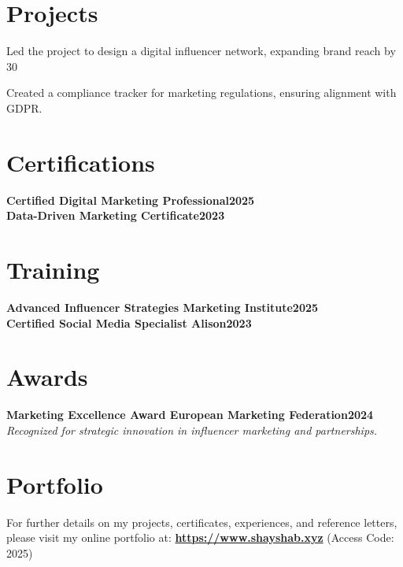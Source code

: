 \documentclass[letterpaper,10pt]{article}
\newcommand{\heading}[2]{
  \hspace{10pt}#1\hfill#2\\
}
\newcommand{\headingBf}[2]{
  \heading{\textbf{#1}}{\textbf{#2}}
}
\newcommand{\headingIt}[2]{
  \heading{\textit{#1}}{\textit{#2}}
}
\newenvironment{resume_list}{
  \vspace{-7pt}
  \begin{itemize}[itemsep=-2px, parsep=1pt, leftmargin=20pt, labelsep=10pt]
}{
  \end{itemize}
}
\begin{document}
\vspace{-1em}

\section{Projects}

\begin{resume_list}
    \item Led the project to design a digital influencer network, expanding brand reach by 30%
    \item Created a compliance tracker for marketing regulations, ensuring alignment with GDPR.
\end{resume_list}

\vspace{-1em}

\section{Certifications}

\headingBf{Certified Digital Marketing Professional}{2025}
\headingBf{Data-Driven Marketing Certificate}{2023}

\vspace{-0.5em}

\section{Training}
\headingBf{Advanced Influencer Strategies \textnormal{Marketing Institute}}{2025}
\headingBf{Certified Social Media Specialist \textnormal{Alison}}{2023}

\vspace{-0.5em}

\section{Awards}

\headingBf{Marketing Excellence Award \textnormal{European Marketing Federation}}{2024}
\headingIt{Recognized for strategic innovation in influencer marketing and partnerships.}{}

\vspace{-0.5em}

\section*{Portfolio}

For further details on my projects, certificates, experiences, and reference letters, please visit my online portfolio at: \textbf{\href{https://www.shayshab.xyz/}{https://www.shayshab.xyz}} (Access Code: 2025)
\end{document}
